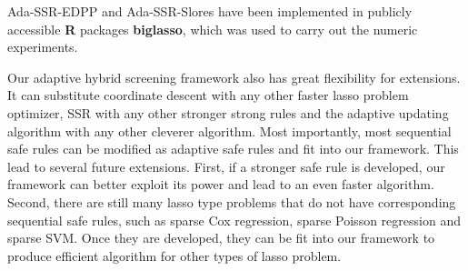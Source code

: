 Ada-SSR-EDPP and Ada-SSR-Slores have been implemented in  publicly accessible \textbf{R} packages \textbf{biglasso}\citep{zeng2017biglasso}, which was used to carry out the numeric experiments.

Our adaptive hybrid screening framework also has great flexibility for extensions. It can substitute coordinate descent with any other faster lasso problem optimizer, SSR with any other stronger strong rules and the adaptive updating algorithm with any other cleverer algorithm. Most importantly, most sequential safe rules can be modified as adaptive safe rules and fit into our framework. This lead to several future extensions. First, if a stronger safe rule is developed, our framework can better exploit its power and lead to an even faster algorithm. Second, there are still many lasso type problems that do not have corresponding sequential safe rules, such as sparse Cox regression, sparse Poisson regression and sparse SVM. Once they are developed, they can be fit into our framework to produce efficient algorithm for other types of lasso problem.



